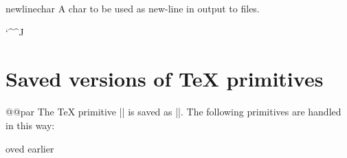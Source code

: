 \begin{docCommand} {newlinechar}{ }
    A char to be used as new-line in output to files.
\end{docCommand}

\begin{teX}
\newlinechar`\^^J
\end{teX}
 \section{Saved versions of \TeX{} primitives}


\begin{docCommand}{@@par}{}
The TeX primitive |\foo| is saved as |\@@foo|.
The following primitives are handled in this way:
\end{docCommand}

\begin{teX}
\let\@@par=\par
\let\@@input= moved earlier
\let\@@end=\end        %
\end{teX}

